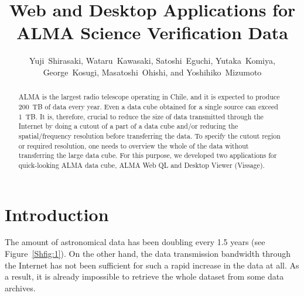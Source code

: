 
\resetcounters




\title{Web and Desktop Applications for ALMA Science Verification Data}

\author{Yuji~Shirasaki, Wataru~Kawasaki, Satoshi~Eguchi, Yutaka~Komiya, George~Kosugi, Masatoshi~Ohishi, and Yoshihiko~Mizumoto
}


\begin{abstract}
ALMA is the largest radio telescope operating in Chile, and it is expected to produce 200~TB of data every year. Even a data cube obtained for a single source can exceed 1~TB. It is, therefore, crucial to reduce the size of data transmitted through the Internet by doing a cutout of a part of a data cube and/or reducing the spatial/frequency resolution before transferring the data. To specify the cutout region or required resolution, one needs to overview the whole of the data without transferring the large data cube. For this purpose, we developed two applications for quick-looking ALMA data cube, ALMA Web QL and Desktop Viewer (Vissage). 
\end{abstract}

\section{Introduction}

The amount of astronomical data has been doubling every 1.5 years (see Figure~\ref{Shfig:1}). On the other hand, the data transmission bandwidth through the Internet has not been sufficient for such a rapid increase in the data at all. As a result, it is already impossible to retrieve the whole dataset from some data archives. 


